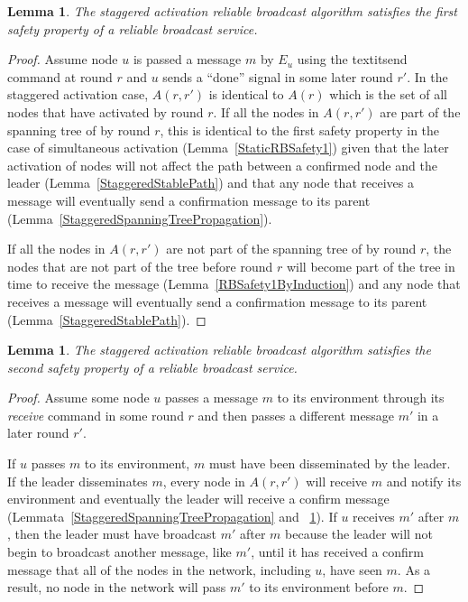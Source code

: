 \documentclass[english]{article}
\newtheorem{lemma}[theorem]{Lemma}
\begin{document}
\begin{lemma}
\label{StaggeredRBSafety1}
The staggered activation reliable broadcast algorithm satisfies the first safety property of a reliable broadcast service.
\end{lemma}
\begin{proof}

Assume node $u$ is passed a message $m$ by $E_u$ using the textit{send} command at round $r$ and $u$ sends  a ``done'' signal in some later round $r'$.
In the staggered activation case, $A(r,r')$ is identical to $A(r)$ which is the set of all nodes that have activated by round $r$. If all the nodes in $A(r,r')$ are part of the spanning tree of by round $r$, this is identical to the first safety property in the case of simultaneous activation (Lemma~\ref{StaticRBSafety1}) given that the later activation of nodes will not affect the path between a confirmed node and the leader (Lemma~\ref{StaggeredStablePath}) and that any node that receives a message will eventually send a confirmation message to its parent (Lemma~\ref{StaggeredSpanningTreePropagation}). 

If all the nodes in $A(r,r')$ are not part of the spanning tree of by round $r$, the nodes that are not part of the tree before round $r$ will become part of the tree in time to receive the message (Lemma~\ref{RBSafety1ByInduction}) and any node that receives a message will eventually send a confirmation message to its parent (Lemma~\ref{StaggeredStablePath}).

\end{proof}


\begin{lemma}
\label{StaggeredRBSafety2}
The staggered activation reliable broadcast algorithm satisfies the second safety property of a reliable broadcast service.
\end{lemma}
\begin{proof}

Assume some node $u$ passes a message $m$ to its environment through its \textit{receive} command in some round $r$ and then passes a different message $m'$ in a later round $r'$. 

If $u$ passes $m$ to its environment, $m$ must have been disseminated by the leader. If the leader disseminates $m$, every node in $A(r,r')$ will receive $m$ and notify its environment and eventually the leader will receive a confirm message (Lemmata~\ref{StaggeredSpanningTreePropagation} and ~\ref{StaggeredRBSafety1}). If $u$ receives $m'$ after $m$, then the leader must have broadcast $m'$ after $m$ because the leader will not begin to broadcast another message, like $m'$, until it has received a confirm message that all of the nodes in the network, including $u$, have seen $m$. As a result, no node in the network will pass $m'$ to its environment before $m$.

\end{proof}
\end{document}
